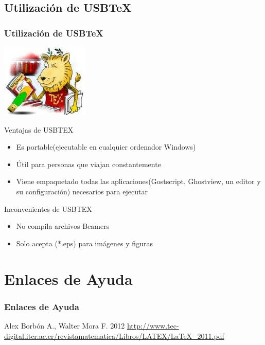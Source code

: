 \documentclass[sans serif,9pt,xcolor=dvipsnames]{beamer}%
\begin{document}
\subsection{Utilización de USBTeX}
\begin{frame}
\frametitle {Utilización de USBTeX}
\begin{center}
\includegraphics[height=1.5 cm]{imagenes/usbtex.png} 
\end{center}
\begin{block}{Ventajas de USBTEX}
\begin{itemize}
\justifying
\item Es portable(ejecutable en cualquier ordenador Windows)
\item Útil para personas que viajan constantemente
\item Viene empaquetado todas las aplicaciones(Gostscript, Ghostview, un editor y su configuración) necesarios para ejecutar 
\end{itemize}
\end{block}

\begin{block}{Inconvenientes de USBTEX}
\begin{itemize}
\justifying
\item No compila archivos Beamers
\item Solo acepta (*.eps) para imágenes y figuras
\end{itemize}
\end{block}
\end{frame}

\section{Enlaces de Ayuda}
\begin{frame}
\frametitle {Enlaces de Ayuda}
\begin{thebibliography}{10}
\bibitem{  } Alex Borbón A., Walter Mora F.
 2012
\newblock 
\url{http://www.tec-digital.itcr.ac.cr/revistamatematica/Libros/LATEX/LaTeX_2011.pdf}

\end{thebibliography}
\end{frame}
\end{document}
